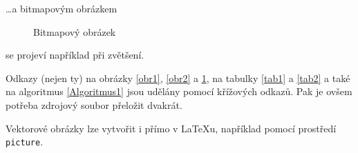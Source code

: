\documentclass[a4paper, 11pt]{article}
\begin{document}
\dots a bitmapovým obrázkem

\begin{figure}[ht]
    \centering
    \label{ObrazekEtiopan}
    \caption{Bitmapový obrázek}\label{obr3}
\end{figure}

se projeví například při zvětšení.

Odkazy (nejen ty) na obrázky \ref{obr1}, \ref{obr2} a \ref{obr3}, na tabulky \ref{tab1} a \ref{tab2} a také na algoritmus \ref{Algoritmus1} jsou udělány pomocí křížových odkazů. Pak je ovšem potřeba zdrojový soubor přeložit dvakrát.

Vektorové obrázky lze vytvořit i přímo v \LaTeX u, například pomocí prostředí \texttt{picture}.

\newpage
\end{document}

